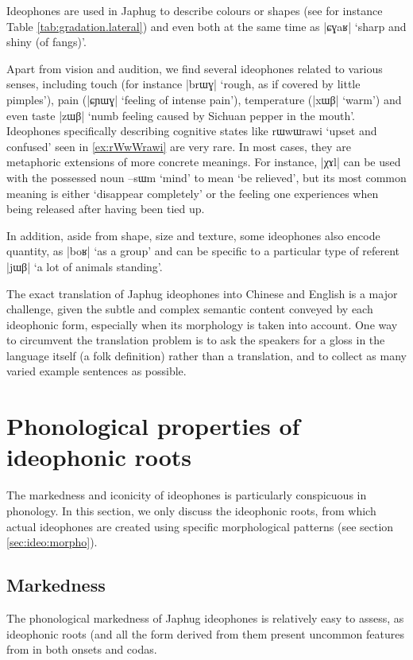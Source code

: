 \documentclass[oldfontcommands,oneside,a4paper,11pt]{article}
\newcommand{\ipa}[1]{{\phon \mbox{#1}}} %
\begin{document}
Ideophones are used in Japhug to describe colours or shapes (see for instance Table  \ref{tab:gradation.lateral}) and even both at the same time as |\ipa{ɕɣaʁ}| `sharp and shiny (of fangs)'.
 
 Apart from vision and audition, we find several ideophones related to various senses, including touch (for instance |\ipa{brɯɣ}|  `rough, as if covered by little pimples'), pain (|\ipa{ɕɲɯɣ}| `feeling of intense pain'), temperature (|\ipa{xɯβ}| `warm') and even taste |\ipa{zɯβ}| `numb feeling caused by Sichuan pepper in the mouth'.  
 Ideophones specifically describing cognitive states like \ipa{rɯwɯrawi}  `upset and confused' seen in \ref{ex:rWwWrawi} are very rare. In most cases, they are metaphoric extensions of more concrete meanings. For instance, |\ipa{χɤl}|  can be used with the possessed noun \ipa{--sɯm} `mind' to mean `be relieved', but its most common meaning is either `disappear completely' or the feeling one experiences when being released after having been tied up.
  
  
  In addition, aside from shape, size and texture, some ideophones also encode quantity, as |\ipa{boʁ}| `as a group' and can be specific to a particular type of referent |\ipa{jɯβ}| `a lot of animals standing'.
  
  The exact translation of Japhug ideophones into Chinese and English is a major challenge, given the subtle and complex semantic content conveyed by each ideophonic form, especially when its morphology is taken into account. One way to circumvent the translation problem is to ask the speakers for a gloss in the language itself (a folk definition) rather than a translation, and to collect as many varied example sentences as possible.
  
  \section{Phonological properties of ideophonic roots}
The markedness and iconicity of ideophones is particularly conspicuous in phonology. In this section, we only discuss the ideophonic roots, from which actual ideophones are created using specific morphological patterns (see section \ref{sec:ideo:morpho}).
 
 \subsection{Markedness}
 The phonological markedness of Japhug ideophones is relatively easy to assess, as ideophonic roots (and all the form derived from them present uncommon features from in both onsets and codas.
\end{document}
